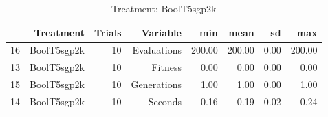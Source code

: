 \begin{table}[ht]
\centering
\begin{tabular}{rrrrrrrr}
  \hline
 & Treatment & Trials & Variable & min & mean & sd & max \\ 
  \hline
16 & BoolT5sgp2k &  10 & Evaluations & 200.00 & 200.00 & 0.00 & 200.00 \\ 
  13 & BoolT5sgp2k &  10 & Fitness & 0.00 & 0.00 & 0.00 & 0.00 \\ 
  15 & BoolT5sgp2k &  10 & Generations & 1.00 & 1.00 & 0.00 & 1.00 \\ 
  14 & BoolT5sgp2k &  10 & Seconds & 0.16 & 0.19 & 0.02 & 0.24 \\ 
   \hline
\end{tabular}
\caption{Treatment: BoolT5sgp2k} 
\end{table}
